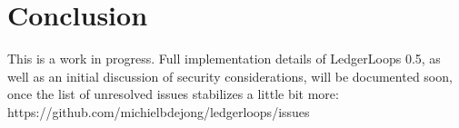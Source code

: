 \documentclass[11pt,twoside,a4paper]{article}
\begin{document}
\section{Conclusion}
This is a work in progress. Full implementation details of LedgerLoops 0.5, as well as an initial discussion of security considerations,
will be documented soon, once the list of unresolved issues stabilizes a little bit more:
https://github.com/michielbdejong/ledgerloops/issues
\end{document}
